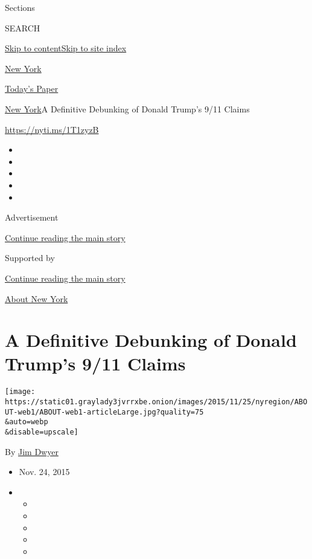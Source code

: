 Sections

SEARCH

\protect\hyperlink{site-content}{Skip to
content}\protect\hyperlink{site-index}{Skip to site index}

\href{https://www.nytimes3xbfgragh.onion/section/nyregion}{New York}

\href{https://myaccount.nytimes3xbfgragh.onion/auth/login?response_type=cookie\&client_id=vi}{}

\href{https://www.nytimes3xbfgragh.onion/section/todayspaper}{Today's
Paper}

\href{/section/nyregion}{New York}\textbar{}A Definitive Debunking of
Donald Trump's 9/11 Claims

\url{https://nyti.ms/1T1zyzB}

\begin{itemize}
\item
\item
\item
\item
\item
\end{itemize}

Advertisement

\protect\hyperlink{after-top}{Continue reading the main story}

Supported by

\protect\hyperlink{after-sponsor}{Continue reading the main story}

\href{/column/about-new-york}{About New York}

\hypertarget{a-definitive-debunking-of-donald-trumps-911-claims}{%
\section{A Definitive Debunking of Donald Trump's 9/11
Claims}\label{a-definitive-debunking-of-donald-trumps-911-claims}}

\texttt{[image: https://static01.graylady3jvrrxbe.onion/images/2015/11/25/nyregion/ABOUT-web1/ABOUT-web1-articleLarge.jpg?quality=75\\\&auto=webp\\\&disable=upscale]}

By \href{http://www.nytimes3xbfgragh.onion/by/jim-dwyer}{Jim Dwyer}

\begin{itemize}
\item
  Nov. 24, 2015
\item
  \begin{itemize}
  \item
  \item
  \item
  \item
  \item
  \end{itemize}
\end{itemize}

